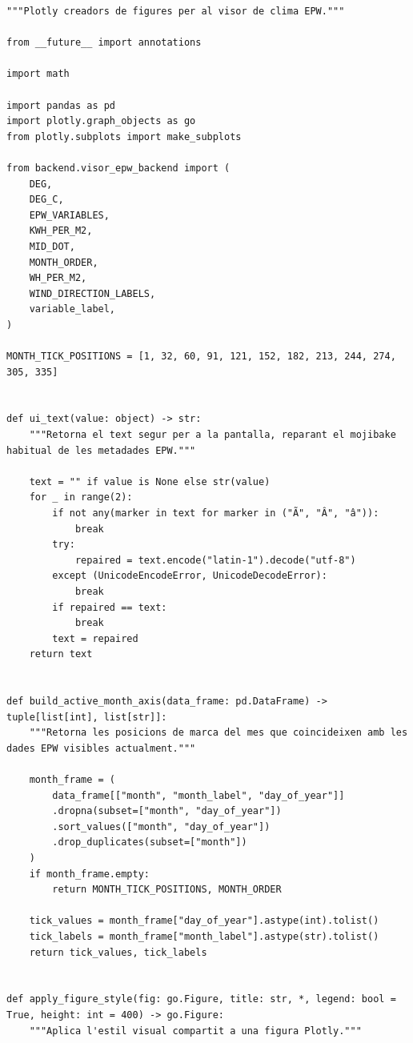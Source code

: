 \documentclass[10pt,a4paper]{article}
\begin{document}
\begin{lstlisting}[style=studioPython,caption={backend/epw\_figures.py},label={lst:backend-epw-figures-py}]
"""Plotly creadors de figures per al visor de clima EPW."""

from __future__ import annotations

import math

import pandas as pd
import plotly.graph_objects as go
from plotly.subplots import make_subplots

from backend.visor_epw_backend import (
    DEG,
    DEG_C,
    EPW_VARIABLES,
    KWH_PER_M2,
    MID_DOT,
    MONTH_ORDER,
    WH_PER_M2,
    WIND_DIRECTION_LABELS,
    variable_label,
)

MONTH_TICK_POSITIONS = [1, 32, 60, 91, 121, 152, 182, 213, 244, 274, 305, 335]


def ui_text(value: object) -> str:
    """Retorna el text segur per a la pantalla, reparant el mojibake habitual de les metadades EPW."""

    text = "" if value is None else str(value)
    for _ in range(2):
        if not any(marker in text for marker in ("Ã", "Â", "â")):
            break
        try:
            repaired = text.encode("latin-1").decode("utf-8")
        except (UnicodeEncodeError, UnicodeDecodeError):
            break
        if repaired == text:
            break
        text = repaired
    return text


def build_active_month_axis(data_frame: pd.DataFrame) -> tuple[list[int], list[str]]:
    """Retorna les posicions de marca del mes que coincideixen amb les dades EPW visibles actualment."""

    month_frame = (
        data_frame[["month", "month_label", "day_of_year"]]
        .dropna(subset=["month", "day_of_year"])
        .sort_values(["month", "day_of_year"])
        .drop_duplicates(subset=["month"])
    )
    if month_frame.empty:
        return MONTH_TICK_POSITIONS, MONTH_ORDER

    tick_values = month_frame["day_of_year"].astype(int).tolist()
    tick_labels = month_frame["month_label"].astype(str).tolist()
    return tick_values, tick_labels


def apply_figure_style(fig: go.Figure, title: str, *, legend: bool = True, height: int = 400) -> go.Figure:
    """Aplica l'estil visual compartit a una figura Plotly."""


\end{lstlisting}
\end{document}
